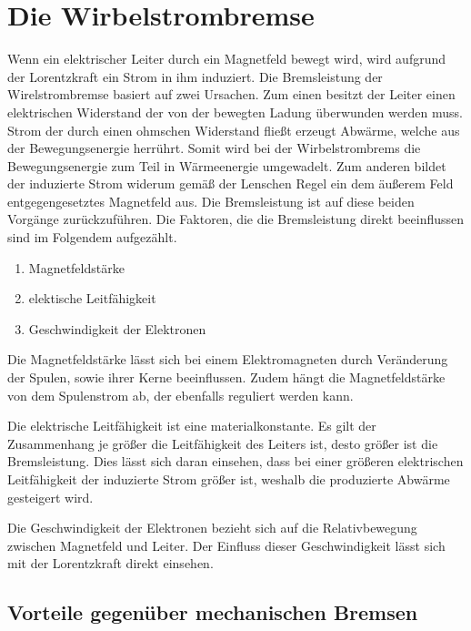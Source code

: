 



\section{Die Wirbelstrombremse}

Wenn ein elektrischer Leiter durch ein Magnetfeld bewegt wird,
wird aufgrund der Lorentzkraft ein Strom in ihm induziert.
Die Bremsleistung der Wirelstrombremse basiert auf zwei Ursachen.
Zum einen besitzt der Leiter einen elektrischen Widerstand der von der
bewegten Ladung überwunden werden muss. Strom der durch einen
ohmschen Widerstand fließt erzeugt Abwärme,
welche aus der Bewegungsenergie herrührt.
Somit wird bei der Wirbelstrombrems die Bewegungsenergie zum Teil in
Wärmeenergie umgewadelt.
Zum anderen bildet der induzierte Strom widerum gemäß der Lenschen Regel ein dem
äußerem Feld entgegengesetztes Magnetfeld aus. Die Bremsleistung
ist auf diese beiden Vorgänge zurückzuführen.
Die Faktoren, die die Bremsleistung direkt beeinflussen
sind im Folgendem aufgezählt.

\begin{enumerate}
  \item Magnetfeldstärke
  \item elektische Leitfähigkeit
  \item Geschwindigkeit der Elektronen
\end{enumerate}

Die Magnetfeldstärke lässt sich bei einem Elektromagneten durch
Veränderung der Spulen, sowie ihrer Kerne beeinflussen. Zudem hängt
die Magnetfeldstärke von dem Spulenstrom ab, der ebenfalls reguliert
werden kann.

Die elektrische Leitfähigkeit ist eine materialkonstante.
Es gilt der Zusammenhang je größer die Leitfähigkeit des Leiters ist,
desto größer ist die Bremsleistung.
Dies lässt sich daran einsehen, dass bei einer größeren
elektrischen Leitfähigkeit der induzierte Strom größer ist, weshalb
die produzierte Abwärme gesteigert wird.

Die Geschwindigkeit der Elektronen bezieht sich auf die
Relativbewegung zwischen Magnetfeld und Leiter. Der Einfluss dieser
Geschwindigkeit lässt sich mit der Lorentzkraft direkt einsehen.

\subsection{Vorteile gegenüber mechanischen Bremsen}

